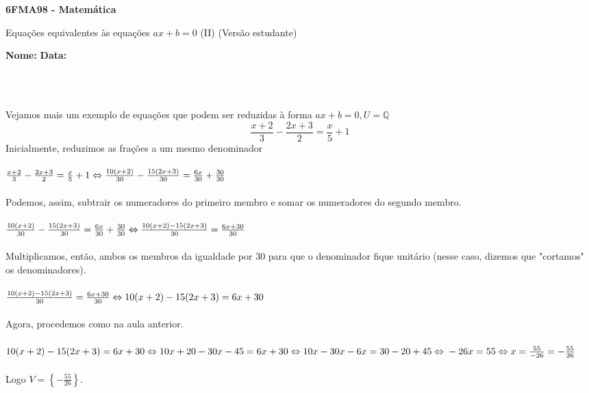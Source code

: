 \documentclass[a4paper,14pt]{article}
\begin{document}
	
	\noindent\textbf{6FMA98 - Matemática} 
	
	\begin{center}Equações equivalentes às equações $ax + b = 0$ (II) (Versão estudante)
	\end{center}
	
	\noindent\textbf{Nome:} \underline{\hspace{10cm}}
	\noindent\textbf{Data:} \underline{\hspace{4cm}}
	
	~ \\ ~
	\begin{multicols}{2}
		\noindent Vejamos mais um exemplo de equações que podem ser reduzidas à forma $ax + b = 0, U = \mathbb{Q}$ \\
		\vspace{-10pt}
		\begin{equation*}
			\frac{x + 2}{3} - \frac{2x + 3}{2} = \frac{x}{5} + 1
		\end{equation*}
		Inicialmente, reduzimos as frações a um mesmo denominador \\\\
		$\frac{x + 2}{3} - \frac{2x + 3}{2} = \frac{x}{5} + 1 \Leftrightarrow \\ \frac{10(x + 2)}{30} - \frac{15(2x + 3)}{30} = \frac{6x}{30} + \frac{30}{30}$ \\\\
		Podemos, assim, subtrair os numeradores do primeiro membro e somar os numeradores do segundo membro. \\\\
		$\frac{10(x + 2)}{30} - \frac{15(2x + 3)}{30} = \frac{6x}{30} + \frac{30}{30} \Leftrightarrow \\\\ \frac{10(x + 2) - 15(2x + 3)}{30} = \frac{6x + 30}{30}$ \\\\
		Multiplicamos, então, ambos os membros da igualdade por 30 para que o denominador fique unitário (nesse caso, dizemos que "cortamos" os denominadores). \\\\
		$\frac{10(x + 2) - 15(2x + 3)}{30} = \frac{6x + 30}{30} \Leftrightarrow \\ 10(x + 2) - 15(2x + 3) = 6x + 30$ \\\\
		Agora, procedemos como na aula anterior. \\\\ 
		$10(x + 2) - 15(2x + 3) = 6x + 30 \Leftrightarrow 10x + 20 - 30x - 45 = 6x + 30 \Leftrightarrow 10x - 30x - 6x = 30 - 20 + 45 \Leftrightarrow \\\\ - 26x = 55 \Leftrightarrow x = \frac{55}{-26} = - \frac{55}{26}$ \\\\
		Logo $V = \left\{- \frac{55}{26}\right\}$.
	\end{multicols}
\end{document}
